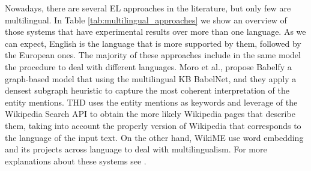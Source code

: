 \documentclass{llncs}
\begin{document}
Nowadays, there are several EL approaches in the literature, but only few are multilingual. In Table \ref{tab:multilingual_approaches} we show an overview of those systems that have experimental results over more than one language. As we can expect, English is the language that is more supported by them, followed by the European ones. The majority of these approaches include in the same model the procedure to deal with different languages. Moro et al., propose Babelfy\cite{Babelfy-moro2014entity} a graph-based model that using the multilingual KB BabelNet, and they apply a densest subgraph heuristic to capture the most coherent interpretation of the entity mentions. THD uses the entity mentions as keywords and leverage of the Wikipedia Search API to obtain the more likely Wikipedia pages that describe them, taking into account the properly version of Wikipedia that corresponds to the language of the input text. On the other hand, WikiME use word embedding and its projects across language to deal with multilingualism. For more explanations about these systems see \cite{ourISWC}.
\end{document}
